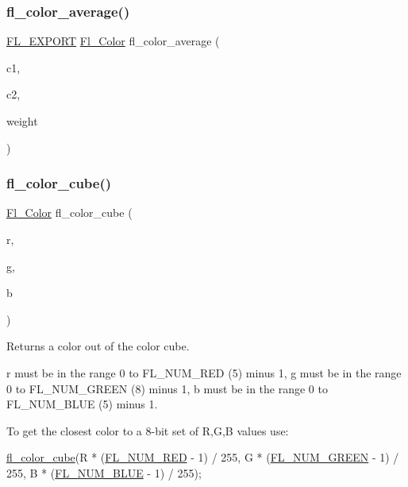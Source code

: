 \subsubsection{\texorpdfstring{fl\+\_\+color\+\_\+average()}{fl\_color\_average()}}
{\footnotesize\ttfamily \hyperlink{_fl___export_8_h_aa9ba29a18aee9d738370a06eeb4470fc}{F\+L\+\_\+\+E\+X\+P\+O\+RT} \hyperlink{_enumerations_8_h_a8b762953646f8abee866061f1af78a6a}{Fl\+\_\+\+Color} fl\+\_\+color\+\_\+average (\begin{DoxyParamCaption}\item[{\hyperlink{_enumerations_8_h_a8b762953646f8abee866061f1af78a6a}{Fl\+\_\+\+Color}}]{c1,  }\item[{\hyperlink{_enumerations_8_h_a8b762953646f8abee866061f1af78a6a}{Fl\+\_\+\+Color}}]{c2,  }\item[{float}]{weight }\end{DoxyParamCaption})}

\mbox{\label{_enumerations_8_h_a2f613709d1c9444f9f03e7c0349223f3}} 
\subsubsection{\texorpdfstring{fl\+\_\+color\+\_\+cube()}{fl\_color\_cube()}}
{\footnotesize\ttfamily \hyperlink{_enumerations_8_h_a8b762953646f8abee866061f1af78a6a}{Fl\+\_\+\+Color} fl\+\_\+color\+\_\+cube (\begin{DoxyParamCaption}\item[{int}]{r,  }\item[{int}]{g,  }\item[{int}]{b }\end{DoxyParamCaption})\hspace{0.3cm}{\ttfamily [inline]}}

Returns a color out of the color cube.

{\ttfamily r} must be in the range 0 to F\+L\+\_\+\+N\+U\+M\+\_\+\+R\+ED (5) minus 1, {\ttfamily g} must be in the range 0 to F\+L\+\_\+\+N\+U\+M\+\_\+\+G\+R\+E\+EN (8) minus 1, {\ttfamily b} must be in the range 0 to F\+L\+\_\+\+N\+U\+M\+\_\+\+B\+L\+UE (5) minus 1.

To get the closest color to a 8-\/bit set of R,G,B values use\+:


\begin{DoxyCode}
\hyperlink{_enumerations_8_h_a2f613709d1c9444f9f03e7c0349223f3}{fl\_color\_cube}(R * (\hyperlink{_enumerations_8_h_a696105c253ebbfd89d9dfc37357ed728}{FL\_NUM\_RED} - 1) / 255,
   G * (\hyperlink{_enumerations_8_h_aff583e05dea4ac7ec09c3f1760a503c0}{FL\_NUM\_GREEN} - 1) / 255,
   B * (\hyperlink{_enumerations_8_h_a35ff0c922707d57042cd509c88f88fea}{FL\_NUM\_BLUE} - 1) / 255);
\end{DoxyCode}
 \mbox{\label{_enumerations_8_h_a4f5d2c8d4113f0af892f9ba232b24ec6}} 

